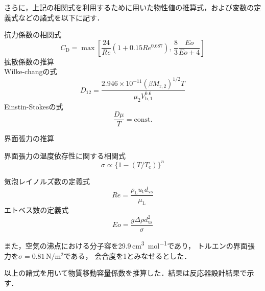 \documentclass[a4j]{jsreport}
\begin{document}
さらに，上記の相関式を利用するために用いた物性値の推算式，および変数の定義式などの諸式を以下に記す．

\noindent 抗力係数の相関式\cite{19952357}
\begin{equation}
    C_\mathrm{D} = \max \left[ \frac{24}{Re}(1+0.15Re^{0.687}), \, \frac{8}{3} \frac{Eo}{Eo+4} \right]
\end{equation}
拡散係数の推算\\
Wilke-changの式\cite{wilke}
\begin{equation}
    D_{12} = \frac{2.946\times 10^{-11}(\beta M_{\mathrm{r,2}})^{1/2} T} {\mu_2 V_{\mathrm{b},1}^{0.6}}
\end{equation}
Einstin-Stokesの式\cite{実験テキスト}
\begin{equation}
    \frac{D \mu}{T} = \text{const.}
\end{equation}

\noindent 界面張力の推算

\noindent 界面張力の温度依存性に関する相関式\cite{化工便覧}
\begin{equation}
    \sigma \propto \{ 1-(T/T_\mathrm{c}) \}^n
\end{equation}

\noindent 気泡レイノルズ数の定義式\cite{19952357}
\begin{equation}
    Re = \frac{\rho_\mathrm{L}u_\mathrm{t} d_\mathrm{vs}}{\mu_\mathrm{L}}
\end{equation}
\noindent エトベス数の定義式\cite{19952357}
\begin{equation}
    Eo = \frac{g \varDelta \rho d_\mathrm{vs}^2}{\sigma}
\end{equation}

また，空気の沸点における分子容を29.9\,\si{\cubic \centi \metre \per \mole}であり\cite{化工便覧}，
トルエンの界面張力を$\sigma=0.81 \,\si{\newton \per \metre \squared}$である\cite{界面張力}，
会合度を1とみなせるとした\cite{TPP}．

以上の諸式を用いて物質移動容量係数を推算した．結果は反応器設計結果で示す．
\end{document}
